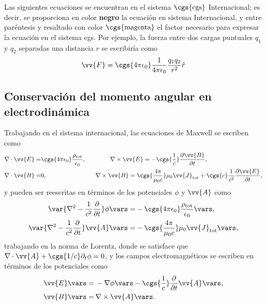 Las siguientes ecuaciones se encuentran en el sistema $\cgs{\text{cgs}}$ Internacional; es decir, se proporciona en color \textbf{negro} la ecuación en sistema Internacional, y entre paréntesis y resaltado con color $\cgs{\text{magenta}}$ el factor necesario para expresar la ecuación en el sistema cgs. Por ejemplo, la fuerza entre dos cargas puntuales $q_1$ y $q_2$ separadas una distancia $r$ se escribiría como
\begin{equation}
\vv{F} = \cgs{4\pi\epsilon_0}\frac{1}{4\pi\epsilon_0} \frac{q_1 q_2}{r^2} \hat{r}
\end{equation}

\subsection{Conservación del momento angular en electrodinámica}
Trabajando en el sistema internacional, las ecuaciones de Maxwell se escriben como \cite{jackson}
\begin{align}
\nabla\cdot\vv{E} =& \cgs{4\pi\epsilon_0}\frac{\rho_{\text{tot}}}{\epsilon_0}, \qquad \qquad \nabla\times\vv{E}=-\cgs{\frac{1}{c}}\frac{\partial\vv{B}}{\partial t}, \nonumber \\
\nabla\cdot\vv{B} =& 0, \qquad \qquad \qquad \qquad \nabla\times\vv{B}=\cgs{\frac{4\pi}{\mu_0 c}}\mu_0\vv{J}_{\text{tot}}+\cgs{c}\frac{1}{c^2}\frac{\partial\vv{E}}{\partial t},
\end{align}
y pueden ser reescritas en términos de los potenciales $\phi$ y $\vv{A}$ como \cite{jackson}
\begin{align}
\var{\nabla^2 -\frac{1}{c^2}\frac{\partial}{\partial t}}\phi\vars =& - \cgs{4\pi\epsilon_0} \frac{\rho_{\text{tot}}}{\epsilon_0}\vars, \label{eq: scalar potential}\\
\var{\nabla^2 -\frac{1}{c^2}\frac{\partial}{\partial t}}\vv{A}\vars =& - \cgs{\frac{4\pi}{\mu_0 c}}\mu_0 \vv{J}_{\text{tot}}\vars,\label{eq: vector potential}
\end{align}
trabajando en la norma de Lorentz, donde se satisface que $\nabla\cdot\vv{A}+\cgs{1/c}\partial_t \phi =0$, y los campos electromagnéticos se escriben en términos de los potenciales como
\begin{align}
\vv{E}\vars =& \, -\nabla\phi\vars - \cgs{\frac{1}{c}}\frac{\partial}{\partial t}\vv{A}\vars, \label{eq: E field potentials}\\
\vv{B}\vars =& \, \nabla\times\vv{A}\vars. \label{eq: B field potentials}
\end{align}

